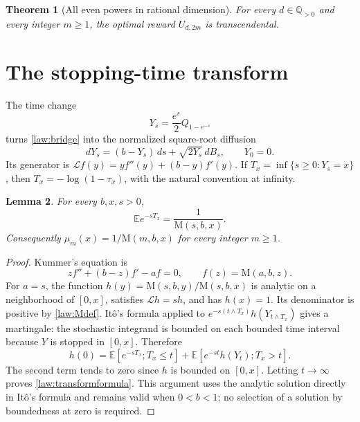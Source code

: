 \documentclass[11pt,a4paper]{article}
\newcommand{\Q}{\mathbb Q}
\newcommand{\M}{\mathrm M}
\newtheorem{theorem}{Theorem}[section]
\newtheorem{lemma}[theorem]{Lemma}
\theoremstyle{definition}
\theoremstyle{remark}
\numberwithin{equation}{section}
\begin{document}
\begin{theorem}[All even powers in rational dimension]\label{law:evenmain}
For every $d\in\Q_{>0}$ and every integer $m\geq1$,
the optimal reward $U_{d,2m}$ is transcendental.
\end{theorem}

\section{The stopping-time transform}

The time change
\begin{equation}\label{law:timechange}
 Y_s=\frac{e^s}{2}Q_{1-e^{-s}}
\end{equation}
turns \eqref{law:bridge} into the normalized square-root diffusion
\begin{equation}\label{law:CIR}
 dY_s=(b-Y_s)\,ds+\sqrt{2Y_s}\,dB_s,\qquad Y_0=0.
\end{equation}
Its generator is $\mathcal Lf(y)=yf''(y)+(b-y)f'(y)$.
If $T_x=\inf\{s\geq0:Y_s=x\}$, then
$T_x=-\log(1-\tau_x)$, with the natural convention at infinity.

\begin{lemma}\label{law:transform}
For every $b,x,s>0$,
\begin{equation}\label{law:transformformula}
 \mathbb{E} e^{-sT_x}=\frac1{\M(s,b,x)}.
\end{equation}
Consequently $\mu_m(x)=1/\M(m,b,x)$ for every integer $m\geq1$.
\end{lemma}
\begin{proof}
Kummer's equation is
\begin{equation}\label{law:kummer}
 zf''+(b-z)f'-af=0,\qquad f(z)=\M(a,b,z).
\end{equation}
For $a=s$, the function
$h(y)=\M(s,b,y)/\M(s,b,x)$ is analytic on a neighborhood of $[0,x]$,
satisfies $\mathcal Lh=sh$, and has $h(x)=1$.
Its denominator is positive by \eqref{law:Mdef}.
It\^o's formula applied to
$e^{-s(t\wedge T_x)}h(Y_{t\wedge T_x})$ gives a martingale: the
stochastic integrand is bounded on each bounded time interval because
$Y$ is stopped in $[0,x]$. Therefore
\[
 h(0)=\mathbb{E}[e^{-sT_x};T_x\leq t]
       +\mathbb{E}[e^{-st}h(Y_t);T_x>t].
\]
The second term tends to zero since $h$ is bounded on $[0,x]$.
Letting $t\to\infty$ proves \eqref{law:transformformula}.
This argument uses the analytic solution directly in It\^o's formula
and remains valid when $0<b<1$; no selection of a solution by
boundedness at zero is required.
\end{proof}
\end{document}
